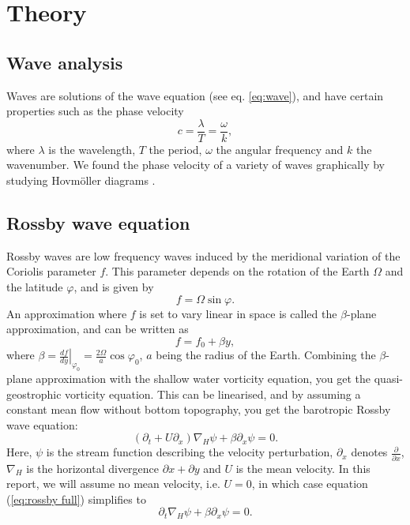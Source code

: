 \section{Theory}
\label{sec:theory}

\subsection{Wave analysis}
\label{sec:waves}
Waves are solutions of the wave equation (see eq. \ref{eq:wave}), and have certain properties such as the phase velocity
	\begin{equation}
	\label{eq:phase}
		c = \frac{\lambda}{T} = \frac{\omega}{k},
	\end{equation}
where $\lambda$ is the wavelength, $T$ the period, $\omega$ the angular frequency and $k$ the wavenumber.
We found the phase velocity of a variety of waves graphically by studying Hovmöller diagrams \citep{hovmoller}.

\subsection{Rossby wave equation}
\label{sec:wave}
Rossby waves are low frequency waves induced by the meridional
variation of the Coriolis parameter $f$. This parameter depends on the rotation of the Earth $\Omega$ and the latitude $\varphi$, and is given by 
\begin{equation}
	f = \Omega \sin{\varphi}.
\end{equation} 
An approximation where $f$ is set to vary linear in space is called the $\beta$-plane approximation, and can be written as
\begin{equation}\label{beta-plane}
	f = f_0 + \beta y,
\end{equation} 
where $\beta = \left.\frac{df}{dy}\right|_{\varphi_0} = \frac{2\Omega}{a} \cos{\varphi_0}$, $a$ being the radius of the Earth. Combining the $\beta$-plane approximation with the shallow water vorticity equation, you get the quasi-geostrophic vorticity equation. This can be linearised, and by assuming a constant mean flow without bottom topography, you get the barotropic Rossby wave equation:
\begin{equation}\label{eq:rossby full}
	\left(\partial_t + U\partial_x \right) \nabla_H \psi + \beta \partial_x \psi = 0.
\end{equation}
Here, $\psi$ is the stream function describing the velocity perturbation, $\partial_x$ denotes $\frac{\partial}{\partial x}$, $\nabla_H$ is the horizontal divergence $\partial x + \partial y$ and $U$ is the mean velocity. In this report, we will assume no mean velocity, i.e. $U=0$, in which case equation (\ref{eq:rossby full}) simplifies to 
\begin{equation}\label{eq:rossby}
	\partial_t \nabla_H \psi + \beta \partial_x \psi = 0.
\end{equation}

